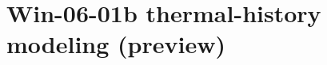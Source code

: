 \documentclass[11pt]{article}
\begin{document}
\section*{Win-06-01b thermal-history modeling (preview)}



\end{document}
